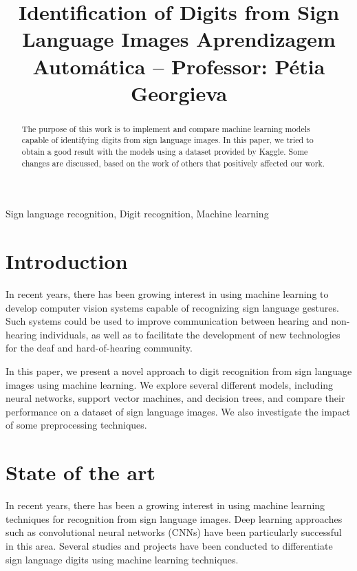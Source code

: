 \documentclass[conference]{IEEEtran}
\begin{document}
\title{Identification of Digits from Sign Language Images
{\small Aprendizagem Automática -- Professor: Pétia Georgieva}
}

\author{
\and
{}
}

\maketitle

\begin{abstract}
    The purpose of this work is to implement and
    compare machine learning models capable of identifying digits from sign language images.
    In this paper, we tried to obtain a good result with the models using
    a dataset provided by Kaggle. Some changes are discussed,
    based on the work of others that positively affected our
    work.
\end{abstract}

\begin{IEEEkeywords}
Sign language recognition, Digit recognition, Machine learning
\end{IEEEkeywords}

\section{Introduction}
In recent years, there has been growing interest in using machine learning to develop computer vision systems capable of recognizing sign language gestures. Such systems could be used to improve communication between hearing and non-hearing individuals, as well as to facilitate the development of new technologies for the deaf and hard-of-hearing community.

In this paper, we present a novel approach to digit recognition from sign language images using machine learning. We explore several different models, including neural networks, support vector machines, and decision trees, and compare their performance on a dataset of sign language images. We also investigate the impact of some preprocessing techniques.


\section{State of the art}
In recent years, there has been a growing interest in using machine learning techniques for recognition from sign language images. Deep learning approaches such as convolutional neural networks (CNNs) have been particularly successful in this area. Several studies and projects have been conducted to differentiate sign language digits using machine learning techniques.
\end{document}
